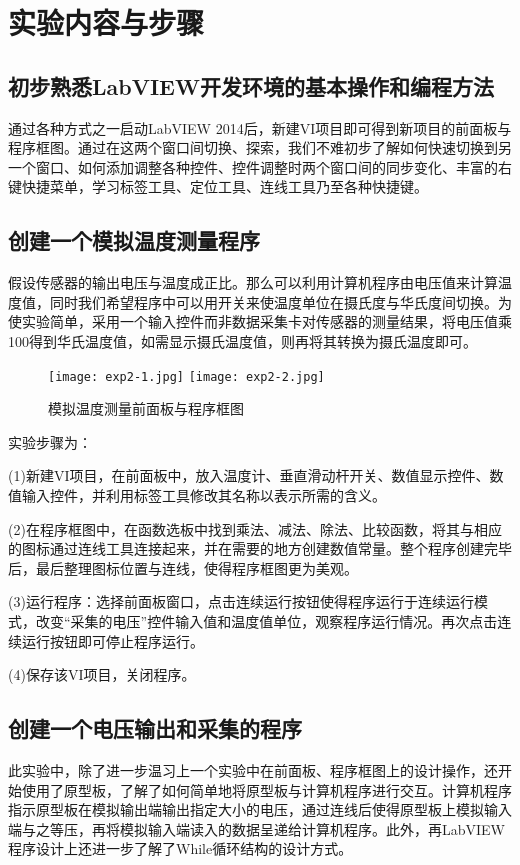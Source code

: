 \documentclass[UTF-8,twoside,cs4size]{ctexart}
\begin{document}
	\section{实验内容与步骤}
	\subsection{初步熟悉LabVIEW开发环境的基本操作和编程方法}
	通过各种方式之一启动LabVIEW 2014后，新建VI项目即可得到新项目的前面板与程序框图。通过在这两个窗口间切换、探索，我们不难初步了解如何快速切换到另一个窗口、如何添加调整各种控件、控件调整时两个窗口间的同步变化、丰富的右键快捷菜单，学习标签工具、定位工具、连线工具乃至各种快捷键。
	\subsection{创建一个模拟温度测量程序}
	假设传感器的输出电压与温度成正比。那么可以利用计算机程序由电压值来计算温度值，同时我们希望程序中可以用开关来使温度单位在摄氏度与华氏度间切换。为使实验简单，采用一个输入控件而非数据采集卡对传感器的测量结果，将电压值乘100得到华氏温度值，如需显示摄氏温度值，则再将其转换为摄氏温度即可。

	\begin{figure}[p]
	\centering
	\texttt{[image: exp2-1.jpg]}
	\texttt{[image: exp2-2.jpg]}
	\caption{\small 模拟温度测量前面板与程序框图}
	\end{figure}

	实验步骤为：

	(1)新建VI项目，在前面板中，放入温度计、垂直滑动杆开关、数值显示控件、数值输入控件，并利用标签工具修改其名称以表示所需的含义。
	
	(2)在程序框图中，在函数选板中找到乘法、减法、除法、比较函数，将其与相应的图标通过连线工具连接起来，并在需要的地方创建数值常量。整个程序创建完毕后，最后整理图标位置与连线，使得程序框图更为美观。
	
	(3)运行程序：选择前面板窗口，点击连续运行按钮使得程序运行于连续运行模式，改变“采集的电压”控件输入值和温度值单位，观察程序运行情况。再次点击连续运行按钮即可停止程序运行。
	
	(4)保存该VI项目，关闭程序。
	
	\subsection{创建一个电压输出和采集的程序}
	此实验中，除了进一步温习上一个实验中在前面板、程序框图上的设计操作，还开始使用了原型板，了解了如何简单地将原型板与计算机程序进行交互。计算机程序指示原型板在模拟输出端输出指定大小的电压，通过连线后使得原型板上模拟输入端与之等压，再将模拟输入端读入的数据呈递给计算机程序。此外，再LabVIEW程序设计上还进一步了解了While循环结构的设计方式。
	
\end{document}
